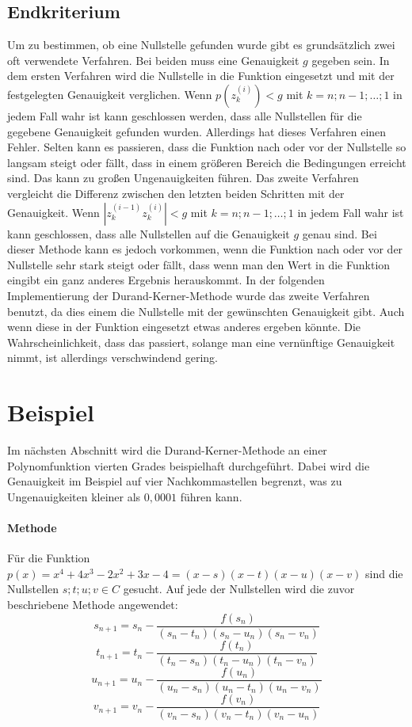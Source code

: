 \documentclass[12pt]{article}
\begin{document}
\subsection{Endkriterium}
Um zu bestimmen, ob eine Nullstelle gefunden wurde gibt es grundsätzlich zwei oft verwendete Verfahren. Bei beiden muss eine Genauigkeit $g$ gegeben sein. 
In dem ersten Verfahren wird die Nullstelle in die Funktion eingesetzt und mit der festgelegten Genauigkeit verglichen. Wenn $p(z_k^{(i)}) < g$ mit $k=n;n-1;\dots ;1$ in jedem Fall wahr ist kann geschlossen werden, dass alle Nullstellen für die gegebene Genauigkeit gefunden wurden. Allerdings hat dieses Verfahren einen Fehler. Selten kann es passieren, dass die Funktion nach oder vor der Nullstelle so langsam steigt oder fällt, dass in einem größeren Bereich die Bedingungen erreicht sind. Das kann zu großen Ungenauigkeiten führen. Das zweite Verfahren vergleicht die Differenz zwischen den letzten beiden Schritten mit der Genauigkeit. Wenn $|z_k^{(i-1)}z_k^{(i)}| < g$ mit $k=n;n-1;\dots ;1$ in jedem Fall wahr ist kann geschlossen, dass alle Nullstellen auf die Genauigkeit $g$ genau sind. Bei dieser Methode kann es jedoch vorkommen, wenn die Funktion nach oder vor der Nullstelle sehr stark steigt oder fällt, dass wenn man den Wert in die Funktion eingibt ein ganz anderes Ergebnis herauskommt. In der folgenden Implementierung der Durand-Kerner-Methode wurde das zweite Verfahren benutzt, da dies einem die Nullstelle mit der gewünschten Genauigkeit gibt. Auch wenn diese in der Funktion eingesetzt etwas anderes ergeben könnte. Die Wahrscheinlichkeit, dass das passiert, solange man eine vernünftige Genauigkeit nimmt, ist allerdings verschwindend gering. 

\section{Beispiel}
Im nächsten Abschnitt wird die Durand-Kerner-Methode an einer Polynomfunktion vierten Grades beispielhaft durchgeführt. Dabei wird die Genauigkeit im Beispiel auf vier Nachkommastellen begrenzt, was zu Ungenauigkeiten kleiner als $0,0001$ führen kann.
\paragraph{Methode}
Für die Funktion $p(x) = x^4 + 4x^3 - 2x^2 + 3x - 4 = (x-s)(x-t)(x-u)(x-v)$ sind die Nullstellen $s;t;u;v \in C$ gesucht. Auf jede der Nullstellen wird die zuvor beschriebene Methode angewendet:
\begin{equation*}
    s_{n+1} = s_n-\frac{f(s_n)}{(s_n-t_n)(s_n-u_n)(s_n-v_n)}
\end{equation*}
\begin{equation*}
    t_{n+1} = t_n-\frac{f(t_n)}{(t_n-s_n)(t_n-u_n)(t_n-v_n)}
\end{equation*}
\begin{equation*}
    u_{n+1} = u_n-\frac{f(u_n)}{(u_n-s_n)(u_n-t_n)(u_n-v_n)}
\end{equation*}
\begin{equation*}
    v_{n+1} = v_n-\frac{f(v_n)}{(v_n-s_n)(v_n-t_n)(v_n-u_n)}
\end{equation*}
\end{document}
